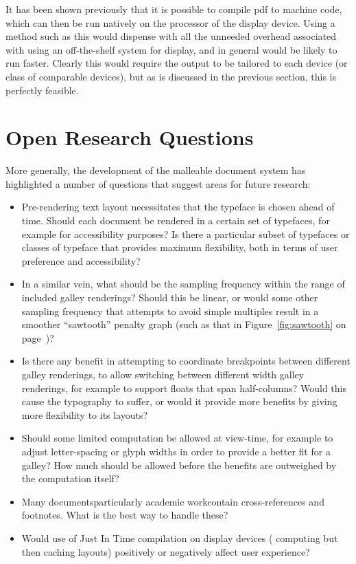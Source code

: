 It has been shown previously\hspace{0pt}\cite{Bagley2010} that it is possible to compile \gls{pdf} to machine code, which can then be run natively on the processor of the display device. Using a method such as this would dispense with all the unneeded overhead associated with using an off-the-shelf system for display, and in general would be likely to run faster. Clearly this would require the output to be tailored to each device (or class of comparable devices), but as is discussed in the previous section, this is perfectly feasible.



\section{Open Research Questions}

More generally, the development of the malleable document system has highlighted a number of questions that suggest areas for future research:

\begin{itemize}
 \item Pre-rendering text layout necessitates that the typeface is chosen ahead of time. Should each document be rendered in a certain set of typefaces, for example for accessibility purposes? Is there a particular subset of typefaces or classes of typeface that provides maximum flexibility, both in terms of user preference and accessibility?

\item In a similar vein, what should be the sampling frequency within the range of included galley renderings? Should this be linear, or would some other sampling frequency that attempts to avoid simple multiples result in a smoother ``sawtooth'' penalty graph (such as that in Figure~\ref{fig:sawtooth} on page~\pageref{fig:sawtooth})?

\item Is there any benefit in attempting to coordinate breakpoints between different galley renderings, to allow switching between different width galley renderings, for example to support floats that span half-columns? Would this cause the typography to suffer, or would it provide more benefits by giving more flexibility to its layouts?

\item Should some limited computation be allowed at view-time, for example to adjust letter-spacing or glyph widths in order to provide a better fit for a galley? How much should be allowed before the benefits are outweighed by the computation itself?

\item Many documents\ed particularly academic work\ed contain cross-references and footnotes. What is the best way to handle these?%

\item Would use of Just In Time compilation on display devices (\ie{} computing but then caching layouts) positively or negatively affect user experience?

\end{itemize}



